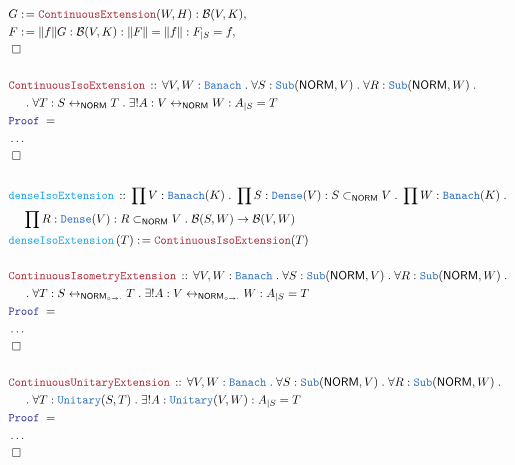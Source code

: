 \documentclass[12pt]{scrartcl}
\newcommand{\TYPE}[1]{\textcolor{NavyBlue}{\mathtt{#1}}}
\newcommand{\FUNC}[1]{\textcolor{Cerulean}{\mathtt{#1}}}
\newcommand{\LOGIC}[1]{\textcolor{Blue}{\mathtt{#1}}}
\newcommand{\THM}[1]{\textcolor{Maroon}{\mathtt{#1}}}
\renewcommand{\.}{\; . \;}
\newcommand{\de}{: \kern 0.1pc =}
\newcommand{\Act}[1]{\left( #1 \right)}
\newcommand{\Theorem}[2]{& \THM{#1} \, :: \, #2 \\ & \Proof = \\ }
\newcommand{\DeclareFunc}[2]{& \FUNC{#1} \, :: \, #2 \\}
\newcommand{\DefineFunc}[3]{&  \FUNC{#1}\Act{#2} \de #3 \\}
\newcommand{\NewLine}{\\ & \kern 1pc}
\newcommand{\Page}[1]{\begin{align*} #1 \end{align*} \newpage   }
\newcommand{\NoProof}{ & \ldots \\ \EndProof}
\newcommand{\ToBij}{\leftrightarrow}
\newcommand{\Say}[3]{& #1 \de #2 : #3, \\}
\newcommand{\QED}{\; \square}
\newcommand{\EndProof}{& \QED \\}
\newcommand{\Proof}{\LOGIC{Proof} \; }
\newcommand{\Dense}{\TYPE{Dense}}
\newcommand{\Banach}{\TYPE{Banach}}
\newcommand{\NORM}{\textsf{NORM}}
\newcommand{\NORMI}{{\textsf{NORM}_{\circ \to \cdot}}}
\newcommand{\B}{\mathcal{B}}
\begin{document}
   \Page{ 
   \Say{G}{\THM{ContinuousExtension}(W,H)}{\B(V,K)}
   \Say{F}{\|f\| G}{\B(V,K) : \| F \| = \| f \| : F_{|S} = f}  
   \EndProof
   \\
   \Theorem{ContinuousIsoExtension}{ \forall  V,W : \Banach \. \forall S : 
   \TYPE{Sub}(\NORM, V) \. \forall R : \TYPE{Sub}(\NORM,W) 
   \.  
   \NewLine   
   \.\forall  T : S \ToBij_\NORM T \.  \exists ! A : V \ToBij_\NORM W    : A_{|S} = T
   }
   \NoProof
   \\ 
   \DeclareFunc{denseIsoExtension}{ \prod V : \Banach(K) \. \prod S : \Dense(V) : S \subset_\NORM V \. \prod W : \Banach(K) \.  \NewLine \prod R : \Dense(V) : R \subset_\NORM V 
\.
 \B(S,W)  \to  \B(V,W) }
\DefineFunc{denseIsoExtension}{T}{\THM{ContinuousIsoExtension}(T)}  
\\
 \Theorem{ContinuousIsometryExtension}{ \forall  V,W : \Banach \. \forall S : 
   \TYPE{Sub}(\NORM, V) \. \forall R : \TYPE{Sub}(\NORM,W) 
   \.  
   \NewLine   
   \.\forall  T : S \ToBij_\NORMI T \.  \exists ! A : V \ToBij_\NORMI W    : A_{|S} = T
   }
   \NoProof
   \\ 
 \Theorem{ContinuousUnitaryExtension}{ \forall  V,W : \Banach \. \forall S : 
   \TYPE{Sub}(\NORM, V) \. \forall R : \TYPE{Sub}(\NORM,W) 
   \.  
   \NewLine   
   \.\forall  T : \TYPE{Unitary}(S, T) \.  \exists ! A : \TYPE{Unitary}(V,  W)    : A_{|S} = T
   }
   \NoProof
}
\end{document}
